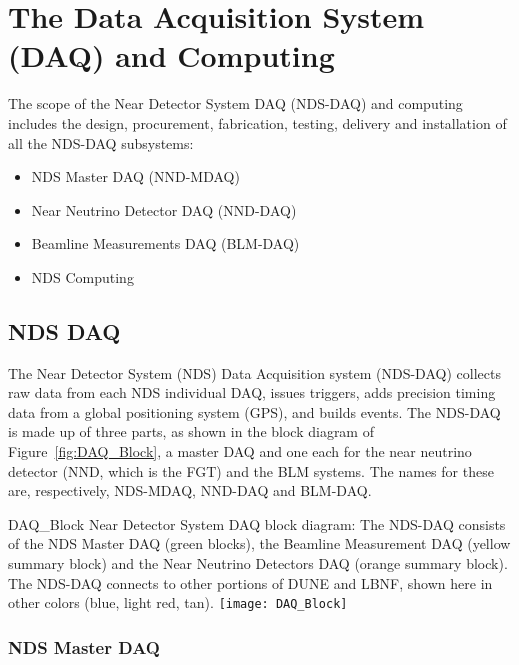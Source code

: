 \section{The Data Acquisition System (DAQ) and Computing}
\label{cdrsec:detectors-nd-ref-daq-comp}

The scope of the Near Detector System DAQ (NDS-DAQ) and computing includes the
design, procurement, fabrication, testing, delivery and installation
of all the NDS-DAQ subsystems: 
\begin{itemize}
\item NDS Master DAQ (NND-MDAQ)
\item Near Neutrino Detector DAQ (NND-DAQ)
\item Beamline Measurements DAQ (BLM-DAQ)
\item NDS Computing
\end{itemize}



\subsection{NDS DAQ}
\label{cdrsec:nd-gdaq-intro}

The Near Detector System (NDS) Data Acquisition system (NDS-DAQ)
collects raw data from each NDS individual DAQ, issues
triggers, adds precision timing data from a global positioning system
(GPS), and builds events.  The NDS-DAQ is made up of three parts, as
shown in the block diagram of Figure~\ref{fig:DAQ_Block}, a master DAQ
and one each for the near neutrino detector (NND, which is the FGT)
and the BLM systems. The names for these are, respectively, NDS-MDAQ,
NND-DAQ and BLM-DAQ.
\begin{cdrfigure}{DAQ_Block}
{Near Detector System DAQ block diagram: The NDS-DAQ consists 
of the NDS Master DAQ (green blocks), the Beamline Measurement DAQ (yellow summary 
block) and the Near Neutrino Detectors DAQ (orange summary block).  The 
NDS-DAQ connects to other portions of DUNE and LBNF, shown here in other colors (blue, 
light red, tan).}
\texttt{[image: DAQ\_Block]}
\end{cdrfigure}

\subsubsection{NDS Master DAQ} 
\label{cdrsec:nd-master-daq}

